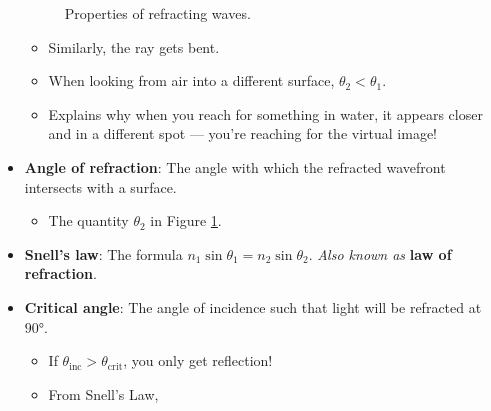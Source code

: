 \documentclass[../notes.tex]{subfiles}
\begin{document}
\begin{itemize}
\begin{figure}[h!]
        \caption{Properties of refracting waves.}
        \label{fig:refractingWaves}
    \end{figure}
    \begin{itemize}
        \item Similarly, the ray gets bent.
        \item When looking from air into a different surface, $\theta_2<\theta_1$.
        \item Explains why when you reach for something in water, it appears closer and in a different spot --- you're reaching for the virtual image!
    \end{itemize}
    \item \textbf{Angle of refraction}: The angle with which the refracted wavefront intersects with a surface.
    \begin{itemize}
        \item The quantity $\theta_2$ in Figure \ref{fig:refractingWaves}.
    \end{itemize}
    \item \textbf{Snell's law}: The formula $n_1\sin\theta_1=n_2\sin\theta_2$. \emph{Also known as} \textbf{law of refraction}.
    \item \textbf{Critical angle}: The angle of incidence such that light will be refracted at $\ang{90}$.
    \begin{itemize}
        \item If $\theta_\text{inc}>\theta_\text{crit}$, you only get reflection!
        \item From Snell's Law,

\end{itemize}
\end{itemize}
\end{document}
